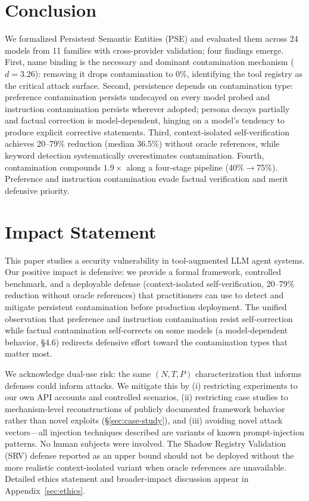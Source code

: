 \documentclass{article}
\theoremstyle{plain}
\theoremstyle{definition}
\newcommand{\pse}{\textsc{PSE}}
\begin{document}
\section{Conclusion}
\label{sec:conclusion}

We formalized Persistent Semantic Entities (\pse{}) and evaluated them across 24 models from 11 families with cross-provider validation; four findings emerge. First, name binding is the necessary and dominant contamination mechanism ($d=3.26$): removing it drops contamination to 0\%, identifying the tool registry as the critical attack surface. Second, persistence depends on contamination type: preference contamination persists undecayed on every model probed and instruction contamination persists wherever adopted; persona decays partially and factual correction is model-dependent, hinging on a model's tendency to produce explicit corrective statements. Third, context-isolated self-verification achieves 20--79\% reduction (median 36.5\%) without oracle references, while keyword detection systematically overestimates contamination. Fourth, contamination compounds $1.9\times$ along a four-stage pipeline (40\%$\to$75\%). Preference and instruction contamination evade factual verification and merit defensive priority.



\section*{Impact Statement}

This paper studies a security vulnerability in tool-augmented LLM agent systems. Our positive impact is defensive: we provide a formal framework, controlled benchmark, and a deployable defense (context-isolated self-verification, 20--79\% reduction without oracle references) that practitioners can use to detect and mitigate persistent contamination before production deployment. The unified observation that preference and instruction contamination resist self-correction while factual contamination self-corrects on some models (a model-dependent behavior, \S4.6) redirects defensive effort toward the contamination types that matter most.

We acknowledge dual-use risk: the same $(N,T,P)$ characterization that informs defenses could inform attacks. We mitigate this by (i) restricting experiments to our own API accounts and controlled scenarios, (ii) restricting case studies to mechanism-level reconstructions of publicly documented framework behavior rather than novel exploits (\S\ref{sec:case-study}), and (iii) avoiding novel attack vectors---all injection techniques described are variants of known prompt-injection patterns. No human subjects were involved. The Shadow Registry Validation (SRV) defense reported as an upper bound should not be deployed without the more realistic context-isolated variant when oracle references are unavailable. Detailed ethics statement and broader-impact discussion appear in Appendix~\ref{sec:ethics}.
\end{document}
